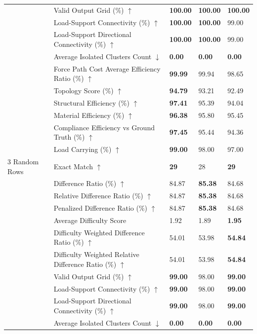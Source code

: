 \begin{table}[!h]
{\begin{tabular}{lllll}
 & Valid Output Grid (\%) $\uparrow$ & \textbf{100.00} & \textbf{100.00} & \textbf{100.00} \\
 & Load-Support Connectivity (\%) $\uparrow$ & \textbf{100.00} & \textbf{100.00} & 99.00 \\
 & Load-Support Directional Connectivity (\%) $\uparrow$ & \textbf{100.00} & \textbf{100.00} & 99.00 \\
 & Average Isolated Clusters Count $\downarrow$ & \textbf{0.00} & \textbf{0.00} & \textbf{0.00} \\
 & Force Path Cost Average Efficiency Ratio (\%) $\uparrow$ & \textbf{99.99} & 99.94 & 98.65 \\
 & Topology Score (\%) $\uparrow$ & \textbf{94.79} & 93.21 & 92.49 \\
 & Structural Efficiency (\%) $\uparrow$ & \textbf{97.41} & 95.39 & 94.04 \\
 & Material Efficiency (\%) $\uparrow$ & \textbf{96.38} & 95.80 & 95.45 \\
 & Compliance Efficiency vs Ground Truth (\%) $\uparrow$ & \textbf{97.45} & 95.44 & 94.36 \\
 & Load Carrying (\%) $\uparrow$ & \textbf{99.00} & 98.00 & 97.00 \\
3 Random Rows & Exact Match $\uparrow$ & \textbf{29} & 28 & \textbf{29} \\
 & Difference Ratio (\%) $\uparrow$ & 84.87 & \textbf{85.38} & 84.68 \\
 & Relative Difference Ratio (\%) $\uparrow$ & 84.87 & \textbf{85.38} & 84.68 \\
 & Penalized Difference Ratio (\%) $\uparrow$ & 84.87 & \textbf{85.38} & 84.68 \\
 & Average Difficulty Score & 1.92 & 1.89 & \textbf{1.95} \\
 & Difficulty Weighted Difference Ratio (\%) $\uparrow$ & 54.01 & 53.98 & \textbf{54.84} \\
 & Difficulty Weighted Relative Difference Ratio (\%) $\uparrow$ & 54.01 & 53.98 & \textbf{54.84} \\
 & Valid Output Grid (\%) $\uparrow$ & \textbf{99.00} & 98.00 & \textbf{99.00} \\
 & Load-Support Connectivity (\%) $\uparrow$ & \textbf{99.00} & 98.00 & \textbf{99.00} \\
 & Load-Support Directional Connectivity (\%) $\uparrow$ & \textbf{99.00} & 98.00 & \textbf{99.00} \\
 & Average Isolated Clusters Count $\downarrow$ & \textbf{0.00} & \textbf{0.00} & \textbf{0.00} \\

\end{tabular}}
\end{table}
